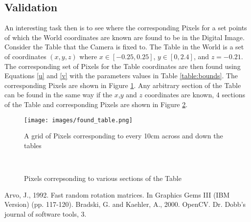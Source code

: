 \documentclass[12pt]{article}
\begin{document}
\subsection{Validation}
An interesting task then is to see where the corresponding Pixels for a set points of which the World coordinates are known are found to be in the Digital Image. Consider the Table that the Camera is fixed to. The Table in the World is a set of coordinates $(x,y,z)$ where $x \in \left[ -0.25,0.25\right]$,  $y \in \left[0,2.4\right]$, and $z=-0.21$.  The corresponding set of Pixels for the Table coordinates are then found using Equations \ref{u} and \ref{v} with the parameters values in Table \ref{table:bounds}. The corresponding Pixels are shown in Figure \ref{fig:result}. Any arbitrary section of the Table can be found in the same way if the $x$,$y$ and $z$ coordinates are known, 4 sections of the Table and corresponding Pixels are shown in Figure \ref{fig:multi_table}.
\\
\newline

\begin{figure}[h]
\centering
\texttt{[image: images/found\_table.png]}
\caption{A grid of Pixels corresponding to every 10cm across and down the tables}\label{fig:result}
\end{figure}

\begin{figure}[h]
    \centering
    \qquad
	\\
    \qquad
    \caption{Pixels correpsonding to various sections of the Table}%
    \label{fig:multi_table}%
\end{figure}


\begin{thebibliography}{9}
Arvo, J., 1992. Fast random rotation matrices. In Graphics Gems III (IBM Version) (pp. 117-120).
Bradski, G. and Kaehler, A., 2000. OpenCV. Dr. Dobb’s journal of software tools, 3.
\end{thebibliography}
\end{document}
